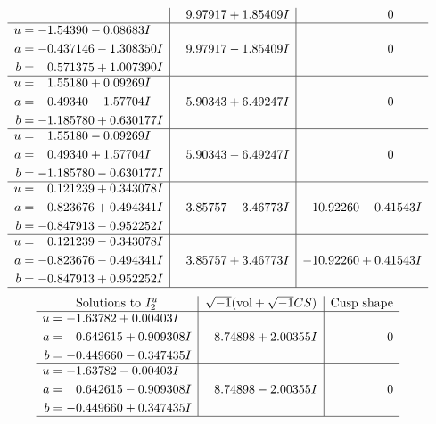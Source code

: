 \documentclass[1p]{elsarticle_modified}
\theoremstyle{definition}
\newcommand{\I}{\sqrt{-1}}
\begin{document}
$$\begin{array}{c|c|c}
 & \phantom{-}9.97917 + 1.85409 I & \phantom{-0.000000 } 0 \\ \hline\begin{aligned}
u &= -1.54390 - 0.08683 I \\
a &= -0.437146 - 1.308350 I \\
b &= \phantom{-}0.571375 + 1.007390 I\end{aligned}
 & \phantom{-}9.97917 - 1.85409 I & \phantom{-0.000000 } 0 \\ \hline\begin{aligned}
u &= \phantom{-}1.55180 + 0.09269 I \\
a &= \phantom{-}0.49340 - 1.57704 I \\
b &= -1.185780 + 0.630177 I\end{aligned}
 & \phantom{-}5.90343 + 6.49247 I & \phantom{-0.000000 } 0 \\ \hline\begin{aligned}
u &= \phantom{-}1.55180 - 0.09269 I \\
a &= \phantom{-}0.49340 + 1.57704 I \\
b &= -1.185780 - 0.630177 I\end{aligned}
 & \phantom{-}5.90343 - 6.49247 I & \phantom{-0.000000 } 0 \\ \hline\begin{aligned}
u &= \phantom{-}0.121239 + 0.343078 I \\
a &= -0.823676 + 0.494341 I \\
b &= -0.847913 - 0.952252 I\end{aligned}
 & \phantom{-}3.85757 - 3.46773 I & -10.92260 - 0.41543 I \\ \hline\begin{aligned}
u &= \phantom{-}0.121239 - 0.343078 I \\
a &= -0.823676 - 0.494341 I \\
b &= -0.847913 + 0.952252 I\end{aligned}
 & \phantom{-}3.85757 + 3.46773 I & -10.92260 + 0.41543 I\\
 \hline 
 \end{array}$$\newpage$$\begin{array}{c|c|c}  
\text{Solutions to }I^u_{2}& \I (\text{vol} + \sqrt{-1}CS) & \text{Cusp shape}\\
 \hline 
\begin{aligned}
u &= -1.63782 + 0.00403 I \\
a &= \phantom{-}0.642615 + 0.909308 I \\
b &= -0.449660 - 0.347435 I\end{aligned}
 & \phantom{-}8.74898 + 2.00355 I & \phantom{-0.000000 } 0 \\ \hline\begin{aligned}
u &= -1.63782 - 0.00403 I \\
a &= \phantom{-}0.642615 - 0.909308 I \\
b &= -0.449660 + 0.347435 I\end{aligned}
 & \phantom{-}8.74898 - 2.00355 I & \phantom{-0.000000 } 0\\
 \hline 
 \end{array}$$\newpage
\end{document}
